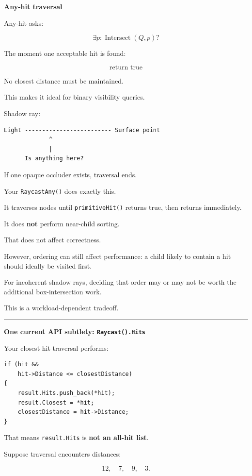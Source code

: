 \textbf{Any-hit traversal}

Any-hit asks:

\[
\exists p:
\operatorname{Intersect}(Q,p)?
\]

The moment one acceptable hit is found:

\[
\boxed{\text{return true}}
\]

No closest distance must be maintained.

This makes it ideal for binary visibility queries.

Shadow ray:

\begin{verbatim}
Light ------------------------- Surface point
             ^
             |
      Is anything here?
\end{verbatim}

If one opaque occluder exists, traversal ends.

Your \texttt{RaycastAny()} does exactly this.

It traverses nodes until \texttt{primitiveHit()} returns true, then returns immediately.

It does \textbf{not} perform near-child sorting.

That does not affect correctness.

However, ordering can still affect performance: a child likely to contain a hit should ideally be visited first.

For incoherent shadow rays, deciding that order may or may not be worth the additional box-intersection work.

This is a workload-dependent tradeoff.

\begin{center}\rule{0.5\linewidth}{0.5pt}\end{center}

\textbf{One current API subtlety: \texttt{Raycast().Hits}}

Your closest-hit traversal performs:

\begin{verbatim}
if (hit &&
    hit->Distance <= closestDistance)
{
    result.Hits.push_back(*hit);
    result.Closest = *hit;
    closestDistance = hit->Distance;
}
\end{verbatim}

That means \texttt{result.Hits} is \textbf{not an all-hit list}.

Suppose traversal encounters distances:

\[
12,\quad 7,\quad 9,\quad 3.
\]

